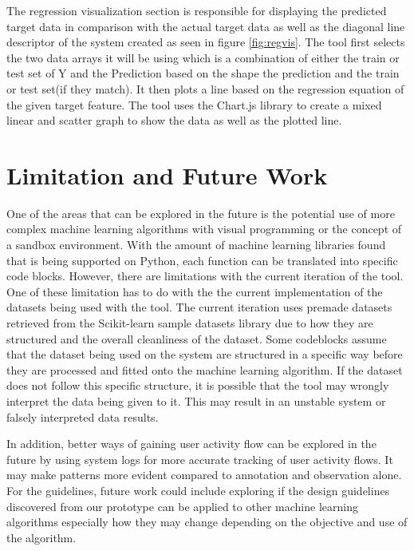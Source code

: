 \documentclass{sigchi}
\begin{document}
The regression visualization section is responsible for displaying the predicted target data in comparison with the actual target data as well as the diagonal line descriptor of the system created as seen in figure \ref{fig:regvis}. The tool first selects the two data arrays it will be using which is a combination of either the train or test set of Y and the Prediction based on the shape the prediction and the train or test set(if they match). It then plots a line based on the regression equation of the given target feature. The tool uses the Chart.js library to create a mixed linear and scatter graph to show the data as well as the plotted line.

\section{Limitation and Future Work}

One of the areas that can be explored in the future is the potential use of more complex machine learning algorithms with visual programming or the concept of a sandbox environment. With the amount of machine learning libraries found that is being supported on Python, each function can be translated into specific code blocks. However, there are limitations with the current iteration of the tool. One of these limitation has to do with the the current implementation of the datasets being used with the tool. The current iteration uses premade datasets retrieved from the Scikit-learn sample datasets library due to how they are structured and the overall cleanliness of the dataset. Some codeblocks assume that the dataset being used on the system are structured in a specific way before they are processed and fitted onto the machine learning algorithm. If the dataset does not follow this specific structure, it is possible that the tool may wrongly interpret the data being given to it. This may result in an unstable system or falsely interpreted data results. 

In addition, better ways of gaining user activity flow can be explored in the future by using system logs for more accurate tracking of user activity flows. It may make patterns more evident compared to annotation and observation alone. For the guidelines, future work could include exploring if the design guidelines discovered from our prototype can be applied to other machine learning algorithms especially how they may change depending on the objective and use of the algorithm. 
\end{document}
